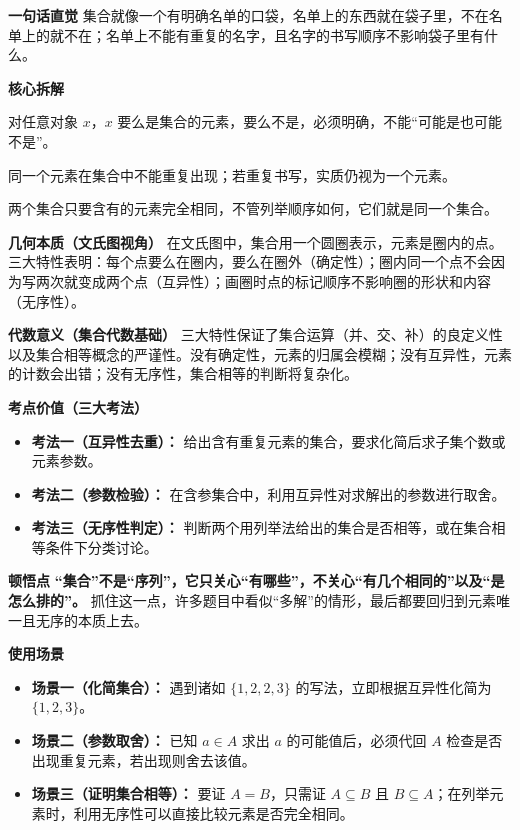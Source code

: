 \begin{explanationbox}
	\textbf{\textcolor{CExplanation}{一句话直觉}}
	集合就像一个有明确名单的口袋，名单上的东西就在袋子里，不在名单上的就不在；名单上不能有重复的名字，且名字的书写顺序不影响袋子里有什么。

	\medskip
	\textbf{\textcolor{CExplanation}{核心拆解}}
	\begin{description}[style=nextline, leftmargin=2.8em, labelsep=0.5em, itemsep=0.45em]
		\item[\textbf{要点一（确定性定义）：}]
			对任意对象 $x$，$x$ 要么是集合的元素，要么不是，必须明确，不能“可能是也可能不是”。
		\item[\textbf{要点二（互异性约束）：}]
			同一个元素在集合中不能重复出现；若重复书写，实质仍视为一个元素。
		\item[\textbf{要点三（无序性特点）：}]
			两个集合只要含有的元素完全相同，不管列举顺序如何，它们就是同一个集合。
	\end{description}

	\medskip
	\textbf{\textcolor{CExplanation}{几何本质（文氏图视角）}}
	在文氏图中，集合用一个圆圈表示，元素是圈内的点。三大特性表明：每个点要么在圈内，要么在圈外（确定性）；圈内同一个点不会因为写两次就变成两个点（互异性）；画圈时点的标记顺序不影响圈的形状和内容（无序性）。

	\medskip
	\textbf{\textcolor{CExplanation}{代数意义（集合代数基础）}}
	三大特性保证了集合运算（并、交、补）的良定义性以及集合相等概念的严谨性。没有确定性，元素的归属会模糊；没有互异性，元素的计数会出错；没有无序性，集合相等的判断将复杂化。

	\medskip
	\textbf{\textcolor{CExplanation}{考点价值（三大考法）}}
	\begin{itemize}[leftmargin=*, itemsep=0.5em, topsep=0.4em]
		\item \textbf{考法一（互异性去重）：} 给出含有重复元素的集合，要求化简后求子集个数或元素参数。
		\item \textbf{考法二（参数检验）：} 在含参集合中，利用互异性对求解出的参数进行取舍。
		\item \textbf{考法三（无序性判定）：} 判断两个用列举法给出的集合是否相等，或在集合相等条件下分类讨论。
	\end{itemize}

	\medskip
	\textbf{\textcolor{CExplanation}{顿悟点}}
	\textbf{“集合”不是“序列”，它只关心“有哪些”，不关心“有几个相同的”以及“是怎么排的”。} 抓住这一点，许多题目中看似“多解”的情形，最后都要回归到元素唯一且无序的本质上去。

	\medskip
	\textbf{\textcolor{CExplanation}{使用场景}}
	\begin{itemize}[leftmargin=*, itemsep=0.5em, topsep=0.4em]
		\item \textbf{场景一（化简集合）：} 遇到诸如 $\{1,2,2,3\}$ 的写法，立即根据互异性化简为 $\{1,2,3\}$。
		\item \textbf{场景二（参数取舍）：} 已知 $a\in A$ 求出 $a$ 的可能值后，必须代回 $A$ 检查是否出现重复元素，若出现则舍去该值。
		\item \textbf{场景三（证明集合相等）：} 要证 $A=B$，只需证 $A\subseteq B$ 且 $B\subseteq A$；在列举元素时，利用无序性可以直接比较元素是否完全相同。
	\end{itemize}

\end{explanationbox}
